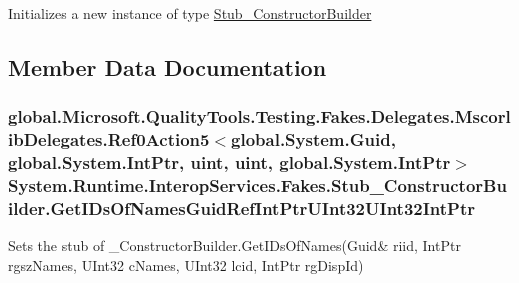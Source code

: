 Initializes a new instance of type \hyperlink{class_system_1_1_runtime_1_1_interop_services_1_1_fakes_1_1_stub___constructor_builder}{Stub\-\_\-\-Constructor\-Builder}



\subsection{Member Data Documentation}
\hypertarget{class_system_1_1_runtime_1_1_interop_services_1_1_fakes_1_1_stub___constructor_builder_a787850bc73dd1e9924c4b90c4926ac0a}{
\subsubsection[{Get\-I\-Ds\-Of\-Names\-Guid\-Ref\-Int\-Ptr\-U\-Int32\-U\-Int32\-Int\-Ptr}]{\setlength{\rightskip}{0pt plus 5cm}global.\-Microsoft.\-Quality\-Tools.\-Testing.\-Fakes.\-Delegates.\-Mscorlib\-Delegates.\-Ref0\-Action5$<$global.\-System.\-Guid, global.\-System.\-Int\-Ptr, uint, uint, global.\-System.\-Int\-Ptr$>$ System.\-Runtime.\-Interop\-Services.\-Fakes.\-Stub\-\_\-\-Constructor\-Builder.\-Get\-I\-Ds\-Of\-Names\-Guid\-Ref\-Int\-Ptr\-U\-Int32\-U\-Int32\-Int\-Ptr}}\label{class_system_1_1_runtime_1_1_interop_services_1_1_fakes_1_1_stub___constructor_builder_a787850bc73dd1e9924c4b90c4926ac0a}


Sets the stub of \-\_\-\-Constructor\-Builder.\-Get\-I\-Ds\-Of\-Names(Guid\& riid, Int\-Ptr rgsz\-Names, U\-Int32 c\-Names, U\-Int32 lcid, Int\-Ptr rg\-Disp\-Id)

